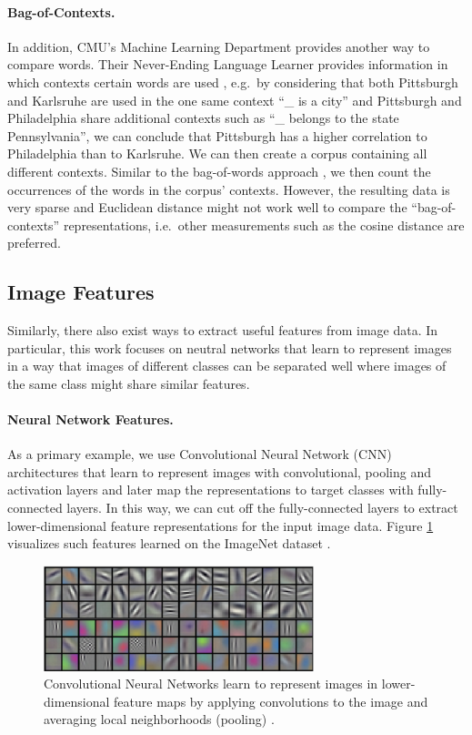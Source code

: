 \paragraph{Bag-of-Contexts.} In addition, CMU's Machine Learning Department provides another way to compare words. Their Never-Ending Language Learner provides information in which contexts certain words are used \cite{nell_pairs}, e.g.\ by considering that both Pittsburgh and Karlsruhe are used in the one same context ``\_ is a city'' and Pittsburgh and Philadelphia share additional contexts such as ``\_ belongs to the state Pennsylvania'', we can conclude that Pittsburgh has a higher correlation to Philadelphia than to Karlsruhe. We can then create a corpus containing all different contexts. Similar to the bag-of-words approach \cite{bow}, we then count the occurrences of the words in the corpus' contexts. However, the resulting data is very sparse and Euclidean distance might not work well to compare the ``bag-of-contexts'' representations, i.e.\ other measurements such as the cosine distance are preferred.

\subsection{Image Features}
\label{sec:imagefeatures}

Similarly, there also exist ways to extract useful features from image data. In particular, this work focuses on neutral networks that learn to represent images in a way that images of different classes can be separated well where images of the same class might share similar features. 

\paragraph{Neural Network Features.} As a primary example, we use Convolutional Neural Network (CNN) architectures that learn to represent images with convolutional, pooling and activation layers and later map the representations to target classes with fully-connected layers. In this way, we can cut off the fully-connected layers to extract lower-dimensional feature representations for the input image data. Figure \ref{fig:cnnfeatures} visualizes such features learned on the ImageNet dataset \cite{krizhevsky2012imagenet}.

\begin{figure}[h]
    \centering
    \includegraphics[width=0.7\textwidth]{images/cnn_features}
    \caption{Convolutional Neural Networks learn to represent images in lower-dimensional feature maps by applying convolutions to the image and averaging local neighborhoods (pooling) \cite{krizhevsky2012imagenet}.}
    \label{fig:cnnfeatures}
\end{figure}


